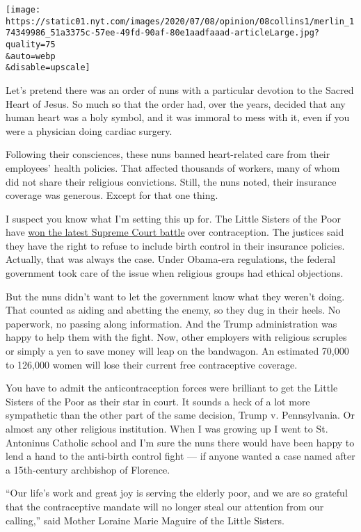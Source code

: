 \texttt{[image: https://static01.nyt.com/images/2020/07/08/opinion/08collins1/merlin\_174349986\_51a3375c-57ee-49fd-90af-80e1aadfaaad-articleLarge.jpg?quality=75\\\&auto=webp\\\&disable=upscale]}

Let's pretend there was an order of nuns with a particular devotion to
the Sacred Heart of Jesus. So much so that the order had, over the
years, decided that any human heart was a holy symbol, and it was
immoral to mess with it, even if you were a physician doing cardiac
surgery.

Following their consciences, these nuns banned heart-related care from
their employees' health policies. That affected thousands of workers,
many of whom did not share their religious convictions. Still, the nuns
noted, their insurance coverage was generous. Except for that one thing.

I suspect you know what I'm setting this up for. The Little Sisters of
the Poor have
\href{https://www.nytimes.com/2020/07/08/us/supreme-court-birth-control-obamacare.html}{won
the latest Supreme Court battle} over contraception. The justices said
they have the right to refuse to include birth control in their
insurance policies. Actually, that was always the case. Under Obama-era
regulations, the federal government took care of the issue when
religious groups had ethical objections.

But the nuns didn't want to let the government know what they weren't
doing. That counted as aiding and abetting the enemy, so they dug in
their heels. No paperwork, no passing along information. And the Trump
administration was happy to help them with the fight. Now, other
employers with religious scruples or simply a yen to save money will
leap on the bandwagon. An estimated 70,000 to 126,000 women will lose
their current free contraceptive coverage.

You have to admit the anticontraception forces were brilliant to get the
Little Sisters of the Poor as their star in court. It sounds a heck of a
lot more sympathetic than the other part of the same decision, Trump v.
Pennsylvania. Or almost any other religious institution. When I was
growing up I went to St. Antoninus Catholic school and I'm sure the nuns
there would have been happy to lend a hand to the anti-birth control
fight --- if anyone wanted a case named after a 15th-century archbishop
of Florence.

``Our life's work and great joy is serving the elderly poor, and we are
so grateful that the contraceptive mandate will no longer steal our
attention from our calling,'' said Mother Loraine Marie Maguire of the
Little Sisters.

